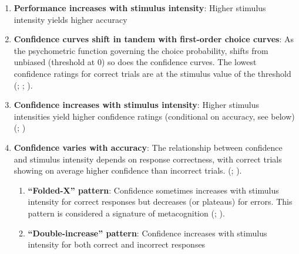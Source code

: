 \documentclass[
]{article}
\begin{document}
\begin{enumerate}
\def\labelenumi{\arabic{enumi}.}
\item
  \textbf{Performance increases with stimulus intensity}: Higher
  stimulus intensity yields higher accuracy
\item
  \textbf{Confidence curves shift in tandem with first-order choice
  curves}: As the psychometric function governing the choice
  probability, shifts from unbiased (threshold at 0) so does the
  confidence curves. The lowest confidence ratings for correct trials
  are at the stimulus value of the threshold
  (;
  ;
  ).
\item
  \textbf{Confidence increases with stimulus intensity}: Higher stimulus
  intensities yield higher confidence ratings (conditional on accuracy,
  see below)
  (;
  )
\item
  \textbf{Confidence varies with accuracy}: The relationship between
  confidence and stimulus intensity depends on response correctness,
  with correct trials showing on average higher confidence than
  incorrect trials.
  (;
  ).

  \begin{enumerate}
  \def\labelenumii{\alph{enumii}.}
  \item
    \textbf{``Folded-X'' pattern}: Confidence sometimes increases with
    stimulus intensity for correct responses but decreases (or plateaus)
    for errors. This pattern is considered a signature of metacognition
    (;
    ).
  \item
    \textbf{``Double-increase'' pattern}: Confidence increases with
    stimulus intensity for both correct and incorrect responses
  \end{enumerate}
\end{enumerate}
\end{document}
